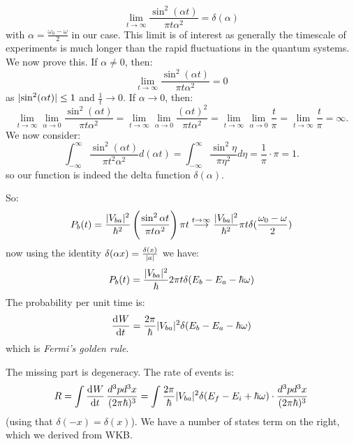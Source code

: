 \begin{equation}
    \lim_{t \to \infty}\frac{\sin^2(\alpha t)}{\pi t \alpha^2} = \delta(\alpha)
\end{equation}
with $\alpha = \frac{\omega_0 - \omega}{2}$ in our case. This limit is of interest as generally the timescale of experiments is much longer than the rapid fluctuations in the quantum systems. We now prove this. If $\alpha \neq 0$, then:
\begin{equation}
    \lim_{t \to \infty}\frac{\sin^2(\alpha t)}{\pi t \alpha^2} = 0
\end{equation}
as $\lvert \sin^2(\alpha t) \rvert \leq 1$ and $\frac{1}{t} \to 0$. If $\alpha \to 0$, then:
\begin{equation}
    \lim_{t \to \infty} \lim_{\alpha \to 0}\frac{\sin^2(\alpha t)}{\pi t \alpha^2} = \lim_{t \to \infty} \lim_{\alpha \to 0}\frac{(\alpha t)^2}{\pi t \alpha^2} = \lim_{t \to \infty} \lim_{\alpha \to 0} \frac{t}{\pi} = \lim_{t \to \infty} \frac{t}{\pi} = \infty.
\end{equation}
We now consider:
\begin{equation}
    \int_{-\infty}^\infty \frac{\sin^2(\alpha t)}{\pi t^2\alpha^2} d(\alpha t) = \int_{-\infty}^\infty \frac{\sin^2 \eta}{\pi \eta^2}d\eta = \frac{1}{\pi} \cdot \pi = 1.
\end{equation}
so our function is indeed the delta function $\delta(\alpha)$.

So:
\begin{equation}
    P_b(t) = \frac{\lvert V_{ba} \rvert^2}{\hbar^2}\left(\frac{\sin^2\alpha t}{\pi t \alpha^2} \right) \pi t \stackrel{t\to\infty}{\longrightarrow} \frac{\lvert V_{ba} \rvert^2}{\hbar^2}\pi t \delta(\frac{\omega_0 - \omega}{2})
\end{equation}
now using the identity $\delta(\alpha x) = \frac{\delta(x)}{\lvert a \rvert}$ we have:
\begin{equation}
    P_b(t) = \frac{\lvert V_{ba} \rvert^2}{\hbar}2\pi t\delta(E_b - E_a - \hbar \omega)
\end{equation}
The probability per unit time is:
\begin{equation}
    \dod{W}{t} = \frac{2\pi}{\hbar}\abs{V_{ba}}^2\delta(E_b - E_a - \hbar\omega)
\end{equation}
which is \emph{Fermi's golden rule}.

The missing part is degeneracy. The rate of events is:
\begin{equation}
    R = \int \dod{W}{t}\frac{d^3pd^3x}{(2\pi\hbar)^3} = \int \frac{2\pi}{\hbar}\abs{V_{ba}}^2\delta(E_f - E_i + \hbar\omega) \cdot \frac{d^3pd^3x}{(2\pi\hbar)^3}
\end{equation}
(using that $\delta(-x) = \delta(x)$). We have a number of states term on the right, which we derived from WKB.

